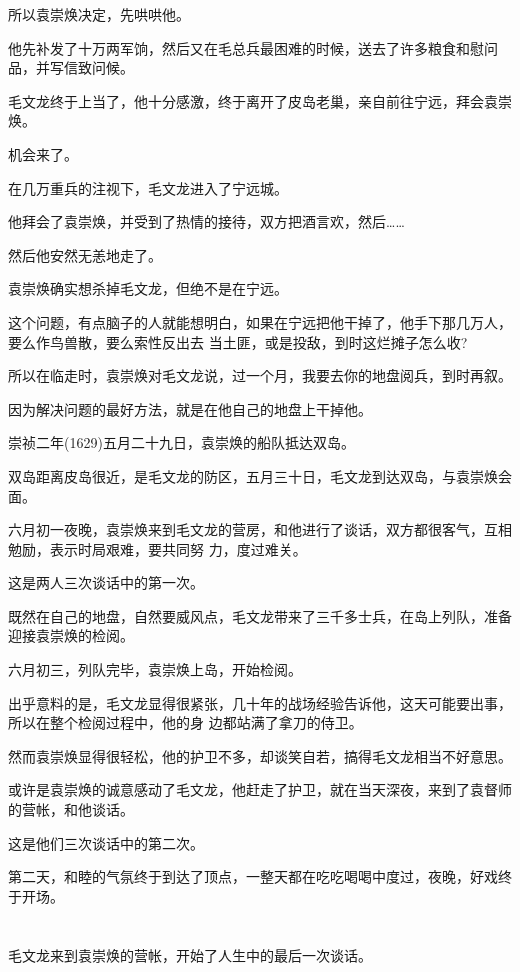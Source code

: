 \documentclass[11pt,a4paper,onecolumn]{article}
\begin{document}
所以袁崇焕决定，先哄哄他。

他先补发了十万两军饷，然后又在毛总兵最困难的时候，送去了许多粮食和慰问品，并写信致问候。

毛文龙终于上当了，他十分感激，终于离开了皮岛老巢，亲自前往宁远，拜会袁崇焕。

机会来了。

在几万重兵的注视下，毛文龙进入了宁远城。

他拜会了袁崇焕，并受到了热情的接待，双方把酒言欢，然后……

然后他安然无恙地走了。

袁崇焕确实想杀掉毛文龙，但绝不是在宁远。

这个问题，有点脑子的人就能想明白，如果在宁远把他干掉了，他手下那几万人，要么作鸟兽散，要么索性反出去
当土匪，或是投敌，到时这烂摊子怎么收?

所以在临走时，袁崇焕对毛文龙说，过一个月，我要去你的地盘阅兵，到时再叙。

因为解决问题的最好方法，就是在他自己的地盘上干掉他。

崇祯二年(1629)五月二十九日，袁崇焕的船队抵达双岛。

双岛距离皮岛很近，是毛文龙的防区，五月三十日，毛文龙到达双岛，与袁崇焕会面。

六月初一夜晚，袁崇焕来到毛文龙的营房，和他进行了谈话，双方都很客气，互相勉励，表示时局艰难，要共同努
力，度过难关。

这是两人三次谈话中的第一次。

既然在自己的地盘，自然要威风点，毛文龙带来了三千多士兵，在岛上列队，准备迎接袁崇焕的检阅。

六月初三，列队完毕，袁崇焕上岛，开始检阅。

出乎意料的是，毛文龙显得很紧张，几十年的战场经验告诉他，这天可能要出事，所以在整个检阅过程中，他的身
边都站满了拿刀的侍卫。

然而袁崇焕显得很轻松，他的护卫不多，却谈笑自若，搞得毛文龙相当不好意思。

或许是袁崇焕的诚意感动了毛文龙，他赶走了护卫，就在当天深夜，来到了袁督师的营帐，和他谈话。

这是他们三次谈话中的第二次。

第二天，和睦的气氛终于到达了顶点，一整天都在吃吃喝喝中度过，夜晚，好戏终于开场。

\section[\thesection]{}

毛文龙来到袁崇焕的营帐，开始了人生中的最后一次谈话。
\end{document}
